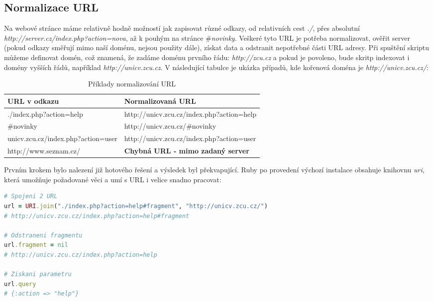 \documentclass[12pt, a4paper]{report}
\begin{document}
\subsection{Normalizace URL}
Na webové stránce máme relativně hodně možností jak zapisovat různé odkazy, od relativních cest \textit{./}, přes absolutní \textit{http://server.cz/index.php?action=nova}, až k pouhým  na stránce \textit{$\#$novinky}. Veškeré tyto URL je potřeba normalizovat, ověřit server (pokud odkazy směřují mimo naší doménu, nejsou použity dále), získat data a odstranit nepotřebné části URL adresy. Při spuštění skriptu můžeme definovat  domén, což znamená, že zadáme doménu prvního řádu: \textit{http://zcu.cz} a pokud je povoleno, bude skritp indexovat i domény vyšších řádů, například \textit{http://unicv.zcu.cz}. V následující tabulce je ukázka případů, kde kořenová doména je \textit{http://unicv.zcu.cz/}:

\begin{table}[!h]
\centering
\begin{tabular}{|l|l|}
\hline
\bf URL v odkazu & \bf Normalizovaná URL \\
\hline
\hline
./index.php?action=help &  http://unicv.zcu.cz/index.php?action=help \\
\hline
$\#$novinky & http://unicv.zcu.cz/$\#$novinky \\
\hline
unicv.zcu.cz/index.php?action=user & http://unicv.zcu.cz/index.php?action=user \\
\hline
http://www.seznam.cz/ & \bf Chybná URL - mimo zadaný server \\
\hline
\end{tabular}
\label{tab:url}
\caption{Příklady normalizování URL}
\end{table}

Prvním krokem bylo nalezení již hotového řešení a výsledek byl překvapující. Ruby po provedení výchozí instalace obsahuje knihovnu \textit{uri}, která umožňuje požadované věci a umí s URL i velice snadno pracovat:

\begin{lstlisting}[label=equals_classes,language=Ruby, caption=Normalizování URL pomocí třídy URI]
# Spojeni 2 URL
url = URI.join("./index.php?action=help#fragment", "http://unicv.zcu.cz/") 
# http://unicv.zcu.cz/index.php?action=help#fragment

# Odstraneni fragmentu
url.fragment = nil
# http://unicv.zcu.cz/index.php?action=help

# Ziskani parametru
url.query
# {:action => "help"}
\end{lstlisting}
\end{document}
